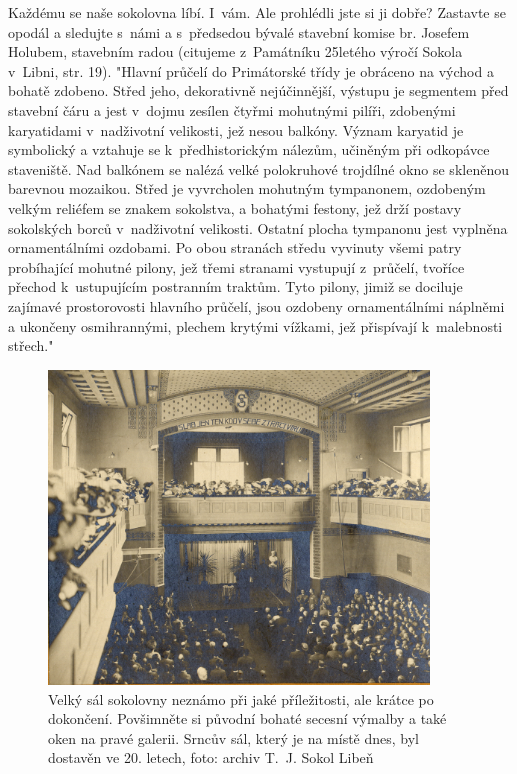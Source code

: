 \documentclass[a5paper, 11pt, twoside]{article}
\begin{document}
Každému se naše sokolovna líbí. I~vám. Ale prohlédli jste si ji dobře?
Zastavte se opodál a sledujte s~námi a s~předsedou bývalé stavební
komise br. Josefem Holubem, stavebním radou (citujeme z~Památníku
25letého výročí Sokola v~Libni, str. 19). "Hlavní průčelí do Primátorské
třídy je obráceno na východ a bohatě zdobeno. Střed jeho, dekorativně
nejúčinnější, výstupu je segmentem před stavební čáru a jest v~dojmu
zesílen čtyřmi mohutnými pilíři, zdobenými karyatidami v~nadživotní
velikosti, jež nesou balkóny. Význam karyatid je symbolický a vztahuje
se k~předhistorickým nálezům, učiněným při odkopávce staveniště. Nad
balkónem se nalézá velké polokruhové trojdílné okno se skleněnou
barevnou mozaikou. Střed je vyvrcholen mohutným tympanonem, ozdobeným
velkým reliéfem se znakem sokolstva, a bohatými festony, jež drží
postavy sokolských borců v~nadživotní velikosti. Ostatní plocha
tympanonu jest vyplněna ornamentálními ozdobami. Po obou stranách středu
vyvinuty všemi patry probíhající mohutné pilony, jež třemi stranami
vystupují z~průčelí, tvoříce přechod k~ustupujícím postranním traktům.
Tyto pilony, jimiž se dociluje zajímavé prostorovosti hlavního průčelí,
jsou ozdobeny ornamentálními náplněmi a ukončeny osmihrannými, plechem
krytými vížkami, jež přispívají k~malebnosti střech."

\begin{figure}[h!]
  \centering 
  \includegraphics[width=0.9\textwidth]{img/20_velky_sal.jpg}
  \caption*{Velký sál sokolovny neznámo při jaké příležitosti, ale krátce po
  dokončení. Povšimněte si původní bohaté secesní výmalby a také oken na
  pravé galerii. Srncův sál, který je na místě dnes, byl dostavěn ve 20.
  letech, foto: archiv T.~J. Sokol Libeň}
\end{figure}
\end{document}
